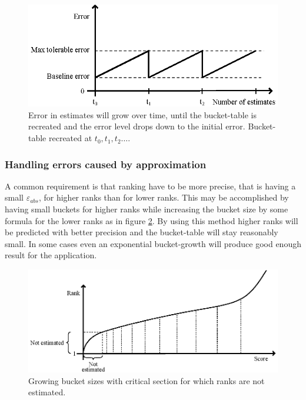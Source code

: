 \begin{figure}[h]
  \centering
  \caption{Error in estimates will grow over time, until the bucket-table is recreated and the error level drops down to the initial error. Bucket-table recreated at $t_0, t_1, t_2 \dots$. 
  }
  \label{fig:errortime}
  \includegraphics[width=13cm]{img/error-over-time.eps}
\end{figure}

\subsubsection{Handling errors caused by approximation}

A common requirement is that ranking have to be more precise, that is having a small $\varepsilon_{abs}$, for higher ranks than for lower ranks. This may be accomplished by having small buckets for higher ranks while increasing the bucket size by some formula for the lower ranks as in figure \ref{fig:growing}.  By using this method higher ranks will be predicted with better precision and the bucket-table will stay reasonably small. In some cases even an exponential bucket-growth will produce good enough result for the application.
 
\begin{figure}[h!]
  \centering
  \caption{Growing bucket sizes with critical section for which ranks are not estimated.}
  \label{fig:growing}
  \includegraphics[width=13cm]{img/growing_bucket_sizes.eps}
\end{figure}

